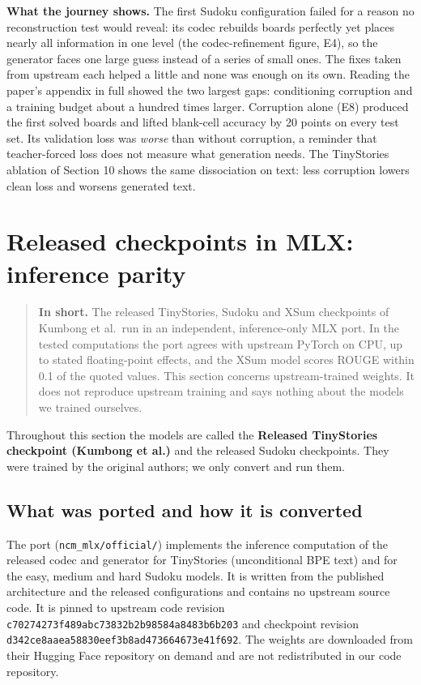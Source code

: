 \documentclass[
  british,
]{article}
\newcounter{none} %
\begin{document}
\textbf{What the journey shows.} The first Sudoku configuration failed
for a reason no reconstruction test would reveal: its codec rebuilds
boards perfectly yet places nearly all information in one level (the
codec-refinement figure, E4), so the generator faces one large guess
instead of a series of small ones. The fixes taken from upstream each
helped a little and none was enough on its own. Reading the paper's
appendix in full showed the two largest gaps: conditioning corruption
and a training budget about a hundred times larger. Corruption alone
(E8) produced the first solved boards and lifted blank-cell accuracy by
20 points on every test set. Its validation loss was \emph{worse} than
without corruption, a reminder that teacher-forced loss does not measure
what generation needs. The TinyStories ablation of Section 10 shows the
same dissociation on text: less corruption lowers clean loss and worsens
generated text.

\section{Released checkpoints in MLX: inference
parity}\label{released-checkpoints-in-mlx-inference-parity}

\begin{quote}
\textbf{In short.} The released TinyStories, Sudoku and XSum checkpoints
of Kumbong et al.~run in an independent, inference-only MLX port. In the
tested computations the port agrees with upstream PyTorch on CPU, up to
stated floating-point effects, and the XSum model scores ROUGE within
0.1 of the quoted values. This section concerns upstream-trained
weights. It does not reproduce upstream training and says nothing about
the models we trained ourselves.
\end{quote}

Throughout this section the models are called the \textbf{Released
TinyStories checkpoint (Kumbong et al.)} and the released Sudoku
checkpoints. They were trained by the original authors; we only convert
and run them.

\subsection{What was ported and how it is
converted}\label{what-was-ported-and-how-it-is-converted}

The port (\texttt{ncm\_mlx/official/}) implements the inference
computation of the released codec and generator for TinyStories
(unconditional BPE text) and for the easy, medium and hard Sudoku
models. It is written from the published architecture and the released
configurations and contains no upstream source code. It is pinned to
upstream code revision \texttt{c70274273f489abc73832b2b98584a8483b6b203}
and checkpoint revision
\texttt{d342ce8aaea58830eef3b8ad473664673e41f692}. The weights are
downloaded from their Hugging Face repository on demand and are not
redistributed in our code repository.
\end{document}
